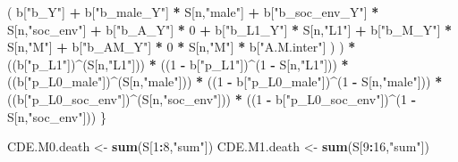 \documentclass[
]{book}
\newenvironment{Shaded}{\begin{snugshade}}{\end{snugshade}}
\newcommand{\DecValTok}[1]{\textcolor[rgb]{0.00,0.00,0.81}{#1}}
\newcommand{\FunctionTok}[1]{\textcolor[rgb]{0.13,0.29,0.53}{\textbf{#1}}}
\newcommand{\NormalTok}[1]{#1}
\newcommand{\OtherTok}[1]{\textcolor[rgb]{0.56,0.35,0.01}{#1}}
\newcommand{\SpecialCharTok}[1]{\textcolor[rgb]{0.81,0.36,0.00}{\textbf{#1}}}
\newcommand{\StringTok}[1]{\textcolor[rgb]{0.31,0.60,0.02}{#1}}
\begin{document}
\begin{Shaded}
\begin{Highlighting}[]
\NormalTok{                      ( b[}\StringTok{"b\_Y"}\NormalTok{] }\SpecialCharTok{+} 
\NormalTok{                          b[}\StringTok{"b\_male\_Y"}\NormalTok{] }\SpecialCharTok{*}\NormalTok{ S[n,}\StringTok{"male"}\NormalTok{] }\SpecialCharTok{+} 
\NormalTok{                          b[}\StringTok{"b\_soc\_env\_Y"}\NormalTok{] }\SpecialCharTok{*}\NormalTok{ S[n,}\StringTok{"soc\_env"}\NormalTok{] }\SpecialCharTok{+} 
\NormalTok{                          b[}\StringTok{"b\_A\_Y"}\NormalTok{] }\SpecialCharTok{*} \DecValTok{0} \SpecialCharTok{+} 
\NormalTok{                          b[}\StringTok{"b\_L1\_Y"}\NormalTok{] }\SpecialCharTok{*}\NormalTok{ S[n,}\StringTok{"L1"}\NormalTok{] }\SpecialCharTok{+}
\NormalTok{                          b[}\StringTok{"b\_M\_Y"}\NormalTok{] }\SpecialCharTok{*}\NormalTok{ S[n,}\StringTok{"M"}\NormalTok{] }\SpecialCharTok{+}
\NormalTok{                          b[}\StringTok{"b\_AM\_Y"}\NormalTok{] }\SpecialCharTok{*} \DecValTok{0} \SpecialCharTok{*}\NormalTok{ S[n,}\StringTok{"M"}\NormalTok{] }\SpecialCharTok{*}\NormalTok{ b[}\StringTok{"A.M.inter"}\NormalTok{] ) ) }\SpecialCharTok{*}
\NormalTok{      ((b[}\StringTok{"p\_L1"}\NormalTok{])}\SpecialCharTok{\^{}}\NormalTok{(S[n,}\StringTok{"L1"}\NormalTok{])) }\SpecialCharTok{*}
\NormalTok{      ((}\DecValTok{1} \SpecialCharTok{{-}}\NormalTok{ b[}\StringTok{"p\_L1"}\NormalTok{])}\SpecialCharTok{\^{}}\NormalTok{(}\DecValTok{1} \SpecialCharTok{{-}}\NormalTok{ S[n,}\StringTok{"L1"}\NormalTok{])) }\SpecialCharTok{*}
\NormalTok{      ((b[}\StringTok{"p\_L0\_male"}\NormalTok{])}\SpecialCharTok{\^{}}\NormalTok{(S[n,}\StringTok{"male"}\NormalTok{])) }\SpecialCharTok{*} 
\NormalTok{      ((}\DecValTok{1} \SpecialCharTok{{-}}\NormalTok{ b[}\StringTok{"p\_L0\_male"}\NormalTok{])}\SpecialCharTok{\^{}}\NormalTok{(}\DecValTok{1} \SpecialCharTok{{-}}\NormalTok{ S[n,}\StringTok{"male"}\NormalTok{])) }\SpecialCharTok{*} 
\NormalTok{      ((b[}\StringTok{"p\_L0\_soc\_env"}\NormalTok{])}\SpecialCharTok{\^{}}\NormalTok{(S[n,}\StringTok{"soc\_env"}\NormalTok{])) }\SpecialCharTok{*}
\NormalTok{      ((}\DecValTok{1} \SpecialCharTok{{-}}\NormalTok{ b[}\StringTok{"p\_L0\_soc\_env"}\NormalTok{])}\SpecialCharTok{\^{}}\NormalTok{(}\DecValTok{1} \SpecialCharTok{{-}}\NormalTok{ S[n,}\StringTok{"soc\_env"}\NormalTok{])) }
\NormalTok{    \}}
  
\NormalTok{  CDE.M0.death }\OtherTok{\textless{}{-}} \FunctionTok{sum}\NormalTok{(S[}\DecValTok{1}\SpecialCharTok{:}\DecValTok{8}\NormalTok{,}\StringTok{"sum"}\NormalTok{])}
\NormalTok{  CDE.M1.death }\OtherTok{\textless{}{-}} \FunctionTok{sum}\NormalTok{(S[}\DecValTok{9}\SpecialCharTok{:}\DecValTok{16}\NormalTok{,}\StringTok{"sum"}\NormalTok{])}
  

\end{Highlighting}
\end{Shaded}
\end{document}
